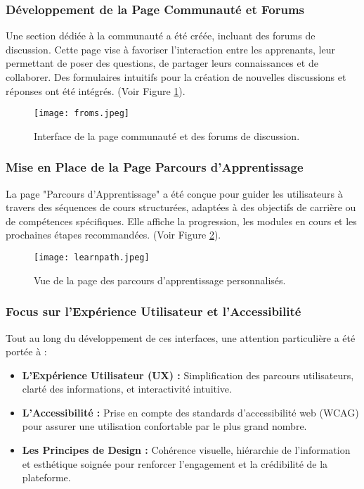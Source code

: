 \documentclass[12pt, a4paper]{article}
\begin{document}
\subsubsection{Développement de la Page Communauté et Forums}
Une section dédiée à la communauté a été créée, incluant des forums de discussion. Cette page vise à favoriser l'interaction entre les apprenants, leur permettant de poser des questions, de partager leurs connaissances et de collaborer. Des formulaires intuitifs pour la création de nouvelles discussions et réponses ont été intégrés. (Voir Figure \ref{fig:community_forum_page}).

\begin{figure}[htbp]
  \centering
  \texttt{[image: froms.jpeg]} %
  \caption{Interface de la page communauté et des forums de discussion.}
  \label{fig:community_forum_page}
\end{figure}

\subsubsection{Mise en Place de la Page Parcours d'Apprentissage}
La page "Parcours d'Apprentissage" a été conçue pour guider les utilisateurs à travers des séquences de cours structurées, adaptées à des objectifs de carrière ou de compétences spécifiques. Elle affiche la progression, les modules en cours et les prochaines étapes recommandées. (Voir Figure \ref{fig:learning_path_page}).

\begin{figure}[htbp]
  \centering
  \texttt{[image: learnpath.jpeg]} %
  \caption{Vue de la page des parcours d'apprentissage personnalisés.}
  \label{fig:learning_path_page}
\end{figure}

\subsubsection{Focus sur l'Expérience Utilisateur et l'Accessibilité}
Tout au long du développement de ces interfaces, une attention particulière a été portée à :
\begin{itemize}
    \item \textbf{L'Expérience Utilisateur (UX) :} Simplification des parcours utilisateurs, clarté des informations, et interactivité intuitive.
    \item \textbf{L'Accessibilité :} Prise en compte des standards d'accessibilité web (WCAG) pour assurer une utilisation confortable par le plus grand nombre.
    \item \textbf{Les Principes de Design :} Cohérence visuelle, hiérarchie de l'information et esthétique soignée pour renforcer l'engagement et la crédibilité de la plateforme.
\end{itemize}
\end{document}
